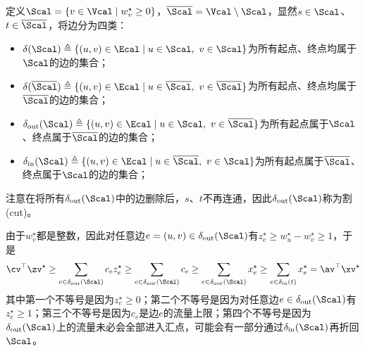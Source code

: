 \documentclass{ctexart}
\begin{document}
定义$\Scal = \{ v \in \Vcal \mid w_v^\star \ge 0 \}$，$\overline{\Scal} = \Vcal \setminus \Scal$，显然$s \in \Scal$、$t \in \overline{\Scal}$，将边分为四类：
\begin{itemize}
    \item $\delta(\Scal) \triangleq \{ (u,v) \in \Ecal \mid u \in \Scal, ~ v \in \Scal \}$为所有起点、终点均属于$\Scal$的边的集合；
    \item $\delta(\overline{\Scal}) \triangleq \{ (u,v) \in \Ecal \mid u \in \overline{\Scal}, ~ v \in \overline{\Scal} \}$为所有起点、终点均属于$\overline{\Scal}$的边的集合；
    \item $\delta_{\text{out}}(\Scal) \triangleq \{ (u,v) \in \Ecal \mid u \in \Scal, ~ v \in \overline{\Scal} \}$为所有起点属于$\Scal$、终点属于$\overline{\Scal}$的边的集合；
    \item $\delta_{\text{in}}(\Scal) \triangleq \{ (u,v) \in \Ecal \mid u \in \overline{\Scal}, ~ v \in \Scal \}$为所有起点属于$\overline{\Scal}$、终点属于$\Scal$的边的集合；
\end{itemize}
注意在将所有$\delta_{\text{out}}(\Scal)$中的边删除后，$s$、$t$不再连通，因此$\delta_{\text{out}}(\Scal)$称为割(cut)。

由于$w_v^\star$都是整数，因此对任意边$e = (u,v) \in \delta_{\text{out}}(\Scal)$有$z_e^\star \ge w_u^\star - w_v^\star \ge 1$，于是
\begin{align*}
    \cv^\top \zv^\star \ge \sum_{e \in \delta_{\text{out}}(\Scal)} c_e z_e^\star \ge \sum_{e \in \delta_{\text{out}}(\Scal)} c_e \ge \sum_{e \in \delta_{\text{out}}(\Scal)} x_e^\star \ge \sum_{e \in \delta_{\text{in}}(t)} x_e^\star = \av^\top \xv^\star
\end{align*}
其中第一个不等号是因为$z_e^\star \ge 0$；第二个不等号是因为对任意边$e \in \delta_{\text{out}}(\Scal)$有$z_e^\star \ge 1$；第三个不等号是因为$c_e$是边$e$的流量上限；第四个不等号是因为$\delta_{\text{out}}(\Scal)$上的流量未必会全部进入汇点，可能会有一部分通过$\delta_{\text{in}}(\Scal)$再折回$\Scal$。
\end{document}
